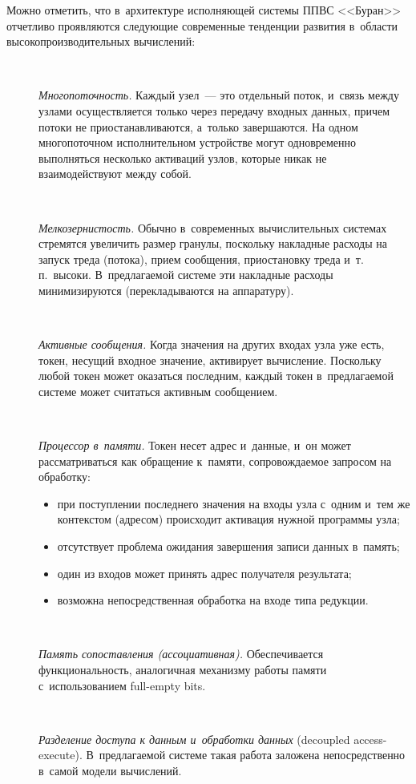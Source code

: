 \begin{multicols}{2}
  Можно отметить, что в~архитектуре исполня\-ющей системы ППВС 
<<Буран>> отчетливо проявляются следующие современные тенденции 
развития в~области высокопроизводительных вычислений:
 \begin{description} 
\item[\,]  \textit{Многопоточность.} Каждый узел~--- это отдельный поток, и~связь 
между узлами осуществляется только через передачу входных данных, причем 
потоки не приостанавливаются, а~только завершаются. На одном 
многопоточном исполнительном устройстве могут одновременно выполняться 
несколько активаций узлов, которые никак не взаимодействуют между собой.
\item[\,]  
  \textit{Мелкозернистость.} Обычно в~современных вычислительных 
системах стремятся увеличить размер гранулы, поскольку накладные расходы 
на запуск треда (потока), прием сообщения, приостановку треда и~т.\,п.\ 
высоки. В~предлагаемой системе эти накладные расходы минимизируются 
(перекладываются на аппаратуру).
\item[\,]  
  \textit{Активные сообщения.} Когда значения на других входах узла уже есть, 
токен, несущий входное значение, активирует вычисление. Поскольку любой 
токен может оказаться последним, каждый токен в~предлагаемой системе 
может считаться активным сообщением.
\item[\,]  
  \textit{Процессор в~памяти.} Токен несет адрес и~данные, и~он может 
рассматриваться как обращение к~памяти, сопровождаемое запросом на 
обработку:
  \begin{itemize}
  \item при поступлении последнего значения на входы узла с~одним и~тем же 
контекстом (адресом) происходит активация нужной программы \mbox{узла};
  \item отсутствует проблема ожидания завершения записи данных в~память;
  \item один из входов может принять адрес получателя результата;
  \item возможна непосредственная обработка на входе типа редукции.
  \end{itemize}
  \item[\,]
  \textit{Память сопоставления (ассоциативная).} Обеспечивается 
функциональность, аналогичная механизму работы памяти с~использованием 
full-empty bits.
  \item[\,]
  \textit{Разделение доступа к данным и~обработки данных}  
(decoupled access-execute). В~предлагаемой сис\-те\-ме такая работа заложена 
непосредственно в~самой модели вычислений.
\end{description}
  

\end{multicols}
